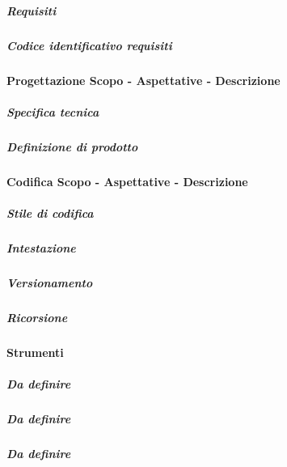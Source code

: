 \subparagraph{Requisiti}
\subparagraph{Codice identificativo requisiti}
\paragraph{Progettazione Scopo - Aspettative - Descrizione}
\subparagraph{Specifica tecnica}
\subparagraph{Definizione di prodotto}
\paragraph{Codifica Scopo - Aspettative - Descrizione}
\subparagraph{Stile di codifica}
\subparagraph{Intestazione}
\subparagraph{Versionamento}
\subparagraph{Ricorsione}
\paragraph{Strumenti}
\subparagraph{Da definire}
\subparagraph{Da definire}
\subparagraph{Da definire}



